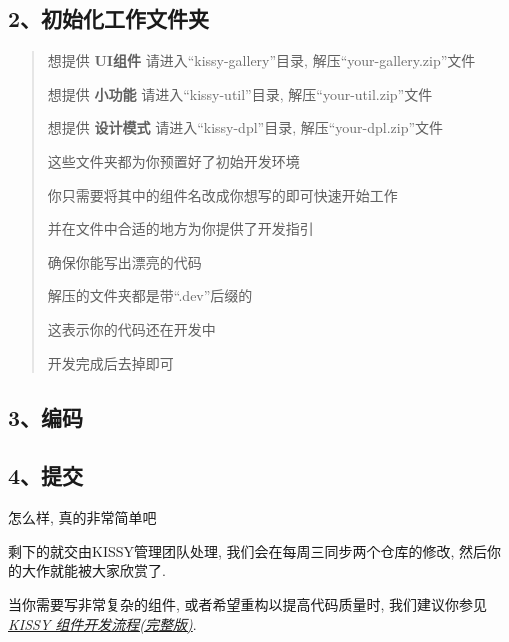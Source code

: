 \documentclass[letterpaper,10pt,english]{sphinxmanual}
\begin{document}
\subsection{2、初始化工作文件夹}
\label{workflow/workflow-simple:id2}\begin{quote}

\begin{DUlineblock}{0em}
\item[] 想提供 \textbf{UI组件} 请进入“kissy-gallery”目录, 解压“your-gallery.zip”文件
\item[] 想提供 \textbf{小功能} 请进入“kissy-util”目录, 解压“your-util.zip”文件
\item[] 想提供 \textbf{设计模式} 请进入“kissy-dpl”目录, 解压“your-dpl.zip”文件
\end{DUlineblock}

\begin{DUlineblock}{0em}
\item[] 这些文件夹都为你预置好了初始开发环境
\item[] 你只需要将其中的组件名改成你想写的即可快速开始工作
\item[] 并在文件中合适的地方为你提供了开发指引
\item[] 确保你能写出漂亮的代码
\end{DUlineblock}

\begin{DUlineblock}{0em}
\item[] 解压的文件夹都是带“.dev”后缀的
\item[] 这表示你的代码还在开发中
\item[] 开发完成后去掉即可
\end{DUlineblock}
\end{quote}


\subsection{3、编码}
\label{workflow/workflow-simple:id3}

\subsection{4、提交}
\label{workflow/workflow-simple:id4}
\begin{DUlineblock}{0em}
\item[] 怎么样, 真的非常简单吧
\item[] 剩下的就交由KISSY管理团队处理, 我们会在每周三同步两个仓库的修改, 然后你的大作就能被大家欣赏了.
\item[] 当你需要写非常复杂的组件, 或者希望重构以提高代码质量时, 我们建议你参见 {\hyperref[workflow/workflow-full:workflow-full]{\emph{KISSY 组件开发流程(完整版)}}}.
\end{DUlineblock}
\end{document}
